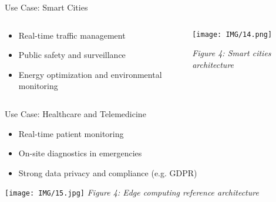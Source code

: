 \documentclass{beamer}
\begin{document}
\begin{frame}{Use Case: Smart Cities}
    \begin{columns}[t]  %
      \begin{column}{0.5\textwidth}
        \begin{itemize}
          \item Real-time traffic management
          \item Public safety and surveillance
          \item Energy optimization and environmental monitoring
        \end{itemize}
      \end{column}
  
      \begin{column}{0.5\textwidth}
        \texttt{[image: IMG/14.png]}
        \vspace{0.2cm}
  
        \small \textit{Figure 4: Smart cities architecture}
      \end{column}
    \end{columns}
  
  \end{frame}
  

\begin{frame}{Use Case: Healthcare and Telemedicine}
  \begin{itemize}
    \item Real-time patient monitoring
    \item On-site diagnostics in emergencies
    \item Strong data privacy and compliance (e.g. GDPR)
  \end{itemize}
  \vspace{0.5cm}
  \centering
  \texttt{[image: IMG/15.jpg]} %
  \vspace{0.2cm}
  \small \textit{Figure 4: Edge computing reference architecture}
\end{frame}
\end{document}
